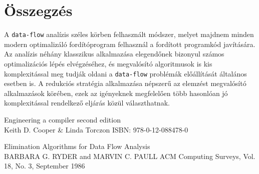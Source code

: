 \documentclass[12pt,a4paper]{article}
\begin{document}
\section{Összegzés}

A \texttt{data-flow} analízis széles körben felhasznált módszer, melyet majdnem minden modern optimalizáló fordítóprogram felhasznál a fordított programkód javítására. Az analízis néhány klasszikus alkalmazása elegendőnek bizonyul számos optimalizációs lépés elvégzéséhez, és megvalósító algoritmusok is kis komplexitással meg tudják oldani a \texttt{data-flow} problémák előállítását általános esetben is. A redukciós stratégia alkalmazása népszerű az elemzést megvalósító alkalmazások körében, ezek az igényeknek megfelelően több hasonlóan jó komplexitással rendelkező eljárás közül választhatnak. 

\begin{thebibliography}{9}
Engineering a compiler second edition \\
Keith D. Cooper \& Linda Torczon
ISBN: 978-0-12-088478-0
 
Elimination Algorithms for Data Flow Analysis \\
BARBARA G. RYDER and MARVIN C. PAULL
ACM Computing Surveys, Vol. 18, No. 3, September 1986 
\end{thebibliography}
\end{document}
